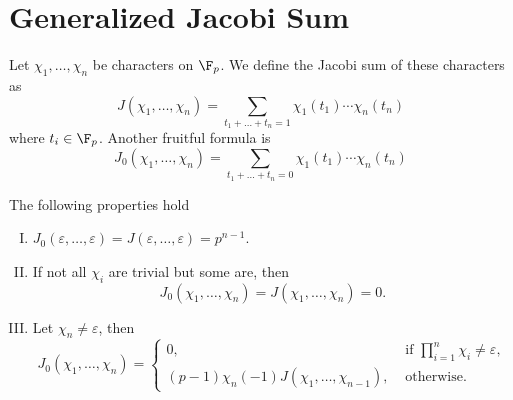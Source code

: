 \section{Generalized Jacobi Sum}

\begin{definition}
   Let \(\chi_1, \dots, \chi_n\) be characters on \(\F_p\). We define the Jacobi
   sum of these characters as
    \[
       J(\chi_1, \dots, \chi_n) = \sum_{t_1+ \dots+t_n = 1}\chi_1(t_1) \cdots
       \chi_n(t_n)
   \] 
   where \(t_i \in \F_p\). Another fruitful formula is 
   \[
      J_0(\chi_1,\dots,\chi_n) = \sum_{t_1+\dots+t_n = 0}
      \chi_1(t_1)\cdots\chi_n(t_n)
   \] 
\end{definition}

\begin{proposition}
   The following properties hold
   \begin{enumerate}[I.]
      \item \(J_0(\varepsilon, \dots, \varepsilon) = J(\varepsilon, \dots,
         \varepsilon) = p^{n-1}\).
      \item If not all \(\chi_i\) are trivial but some are, then 
          \[
             J_0(\chi_1,\dots,\chi_n) = J(\chi_1,\dots,\chi_n) = 0.
         \] 
      \item Let \(\chi_n \neq  \varepsilon\), then
         \[
            J_0(\chi_1,\dots,\chi_n) = 
            \begin{cases}
               0, &\text{ if } \prod_{i=1}^n \chi_i \neq  \varepsilon, \\
               (p-1)\chi_n(-1)J(\chi_1,\dots,\chi_{n-1}), &\text{ otherwise. }
            \end{cases}
         \] 
   \end{enumerate}
\end{proposition}

